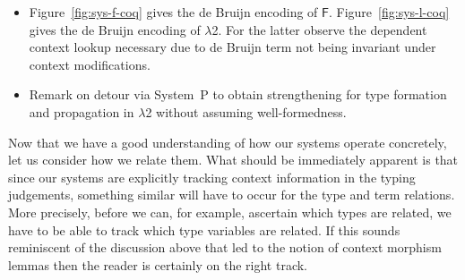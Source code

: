 \documentclass[a4paper,UKenglish]{lipics-v2016}
\newcommand{\SysF}{\ensuremath{\mathsf{F}}\xspace}
\newcommand{\SysL}{$\lambda$2\xspace}
\begin{document}
\begin{itemize}
\item Figure~\ref{fig:sys-f-coq} gives the de Bruijn encoding of \SysF.
  Figure~\ref{fig:sys-l-coq} gives the de Bruijn encoding of \SysL.
  For the latter observe the dependent context lookup necessary due to de Bruijn term not being invariant under context modifications.
\item Remark on detour via System~P to obtain strengthening for type formation and propagation in \SysL without assuming well-formedness.
\end{itemize}

Now that we have a good understanding of how our systems operate concretely, let us consider how we relate them.
What should be immediately apparent is that since our systems are explicitly tracking context information in the typing judgements, something similar will have to occur for the type and term relations.
More precisely, before we can, for example, ascertain which types are related, we have to be able to track which type variables are related.
If this sounds reminiscent of the discussion above that led to the notion of context morphism lemmas then the reader is certainly on the right track.
\end{document}

